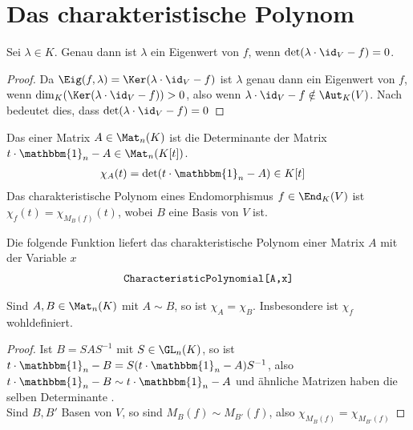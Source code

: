 \section{Das charakteristische Polynom}

\begin{proposition}
	Sei $\lambda\in K$. Genau dann ist $\lambda$ ein Eigenwert von $f$, wenn $\det(\lambda\cdot\id_V-f)=0$.
\end{proposition}
\begin{proof}
	Da $\Eig(f,\lambda)=\Ker(\lambda\cdot\id_V-f)$ ist $\lambda$ genau dann ein Eigenwert von $f$, wenn $\dim_K(\Ker(\lambda\cdot\id_V-f))>0$, also wenn $\lambda\cdot\id_V-f\notin\Aut_K(V)$. Nach  bedeutet dies, dass $\det(\lambda\cdot\id_V-f)=0$
\end{proof}

\begin{definition}
	Das  einer Matrix $A\in\Mat_n(K)$ ist die Determinante der Matrix $t\cdot \mathbbm{1}_n-A\in\Mat_n(K[t])$. 
	\begin{align}
		\chi_A(t)&=\det(t\cdot \mathbbm{1}_n-A)\in K[t] \notag
	\end{align}
	Das charakteristische Polynom eines Endomorphismus $f\in\End_K(V)$ ist $\chi_f(t)=\chi_{M_B(f)}(t)$, wobei $B$ eine Basis von $V$ ist.
\end{definition}

\begin{mathematica}
	Die folgende Funktion liefert das charakteristische Polynom einer Matrix $A$ mit der Variable $x$
	\begin{align}
		\texttt{CharacteristicPolynomial[A,x]}\notag
	\end{align}
\end{mathematica}

\begin{proposition}
	Sind $A,B\in\Mat_n(K)$ mit $A\sim B$, so ist $\chi_A=\chi_B$. Insbesondere ist $\chi_f$ wohldefiniert.
\end{proposition}
\begin{proof}
	Ist $B=SAS^{-1}$ mit $S\in\GL_n(K)$, so ist $t\cdot \mathbbm{1}_n-B = S(t\cdot \mathbbm{1}_n-A)S^{-1}$, also $t\cdot \mathbbm{1}_n-B\sim t\cdot \mathbbm{1}_n-A$ und ähnliche Matrizen haben die selben Determinante . \\
	Sind $B,B'$ Basen von $V$, so sind $M_B(f)\sim M_{B'}(f)$, also $\chi_{M_B(f)}=\chi_{M_{B'}(f)}$
\end{proof}

